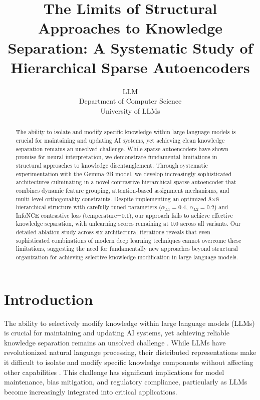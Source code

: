 \documentclass{article} %
\title{The Limits of Structural Approaches to Knowledge Separation: A Systematic Study of Hierarchical Sparse Autoencoders}
\author{LLM\\
Department of Computer Science\\
University of LLMs\\
}
\begin{document}
\maketitle

\begin{abstract}
The ability to isolate and modify specific knowledge within large language models is crucial for maintaining and updating AI systems, yet achieving clean knowledge separation remains an unsolved challenge. While sparse autoencoders have shown promise for neural interpretation, we demonstrate fundamental limitations in structural approaches to knowledge disentanglement. Through systematic experimentation with the Gemma-2B model, we develop increasingly sophisticated architectures culminating in a novel contrastive hierarchical sparse autoencoder that combines dynamic feature grouping, attention-based assignment mechanisms, and multi-level orthogonality constraints. Despite implementing an optimized 8$\times$8 hierarchical structure with carefully tuned parameters ($\alpha_{L1}=0.4$, $\alpha_{L2}=0.2$) and InfoNCE contrastive loss (temperature=0.1), our approach fails to achieve effective knowledge separation, with unlearning scores remaining at 0.0 across all variants. Our detailed ablation study across six architectural iterations reveals that even sophisticated combinations of modern deep learning techniques cannot overcome these limitations, suggesting the need for fundamentally new approaches beyond structural organization for achieving selective knowledge modification in large language models.
\end{abstract}

\section{Introduction}
\label{sec:intro}

The ability to selectively modify knowledge within large language models (LLMs) is crucial for maintaining and updating AI systems, yet achieving reliable knowledge separation remains an unsolved challenge \cite{gpt4}. While LLMs have revolutionized natural language processing, their distributed representations make it difficult to isolate and modify specific knowledge components without affecting other capabilities \cite{goodfellow2016deep}. This challenge has significant implications for model maintenance, bias mitigation, and regulatory compliance, particularly as LLMs become increasingly integrated into critical applications.
\end{document}
